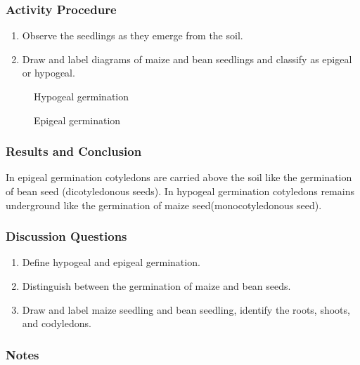 \subsubsection*{Activity Procedure}
\begin{enumerate}
\item{Observe the seedlings as they emerge from the soil.}
\item{Draw and label diagrams of maize and bean seedlings and classify as epigeal or hypogeal.}
\end{enumerate}

\begin{figure}[h]
\begin{center}
\def\svgwidth{6cm}

\caption{Hypogeal germination}
\label{fig:hypogeal}
\end{center}
\end{figure}

\begin{figure}[h]
\begin{center}
\def\svgwidth{7cm}

\caption{Epigeal germination}
\label{fig:epigeal}
\end{center}
\end{figure}

\subsubsection*{Results and Conclusion}
In epigeal germination cotyledons are carried above the soil like the germination of bean seed (dicotyledonous seeds). In hypogeal germination cotyledons remains underground like the germination of maize seed(monocotyledonous seed).

\subsubsection*{Discussion Questions}
\begin{enumerate}
\item{Define hypogeal and epigeal germination.}
\item{Distinguish between the germination of maize and bean seeds.}
\item{Draw and label maize seedling and bean seedling, identify the roots, shoots, and codyledons.}
\end{enumerate}

\subsubsection*{Notes}
